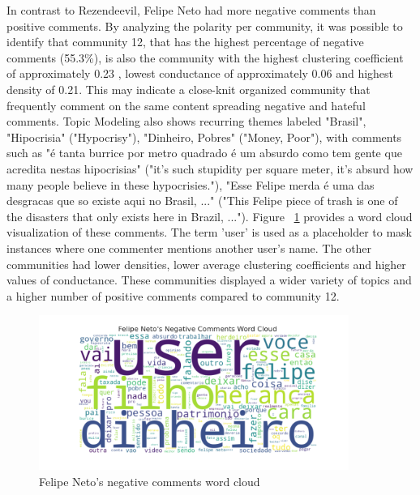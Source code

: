 \documentclass[12pt]{article}
\begin{document}
In contrast to Rezendeevil, Felipe Neto had more negative comments than positive comments. 
By analyzing the polarity per community, it was possible to identify that community 12, 
that has the highest percentage of negative comments (55.3\%), is also the community with the highest clustering 
coefficient of approximately 0.23 , lowest conductance of approximately 0.06 and highest density 
of 0.21. This may indicate a close-knit organized community that frequently comment on the 
same content spreading negative and hateful comments. 
Topic Modeling also shows recurring themes labeled "Brasil", "Hipocrisia" 
("Hypocrisy"), "Dinheiro, Pobres" ("Money, Poor"), with comments such as 
"é tanta burrice por metro quadrado é um absurdo como tem gente que acredita nestas hipocrisias" 
("it's such stupidity per square meter, it's absurd how many people believe in these hypocrisies."),
"Esse Felipe merda é uma das desgracas que so existe aqui no Brasil, ..." 
("This Felipe piece of trash is one of the disasters that only exists here in Brazil, ..."). 
Figure ~\ref{fig:felipeneto_comments} provides a word cloud visualization of these comments.
The term 'user' is used as a placeholder to mask instances where one commenter mentions another user's 
name.
The other communities had lower densities, lower average clustering coefficients and higher values 
of conductance. These communities displayed a wider variety of topics and a higher number of positive 
comments compared to community 12. 

\begin{figure}[hbt!]
    \centering
    \includegraphics[keepaspectratio,width=0.9\textwidth]{./imgs/felipeneto/negative_comments.png}
    \caption[width=\textwidth]{Felipe Neto's negative comments word cloud}
    \label{fig:felipeneto_comments}
\end{figure}
\end{document}
